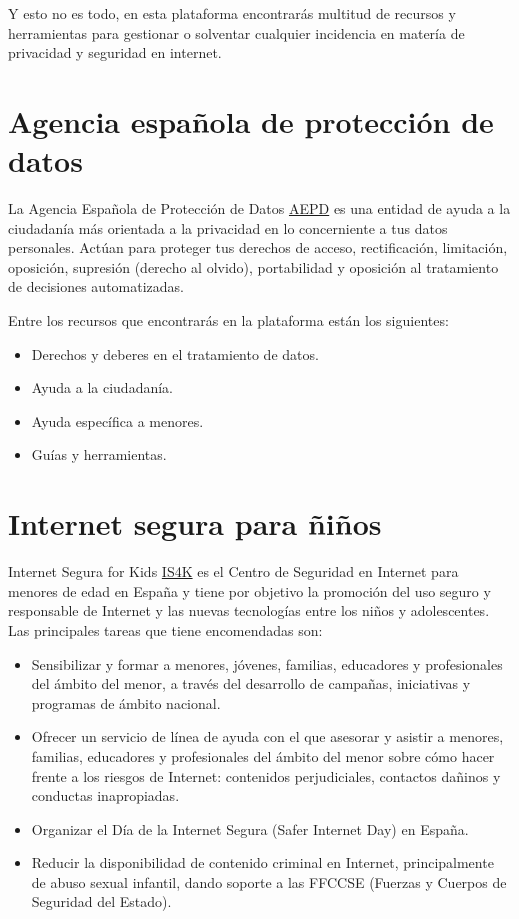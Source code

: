 \documentclass[
  spanish,
  a4paper,
  openany]{book}
\begin{document}
Y esto no es todo, en esta plataforma encontrarás multitud de recursos y herramientas para gestionar o solventar cualquier incidencia en matería de privacidad y seguridad en internet.

\hypertarget{agencia-espauxf1ola-de-protecciuxf3n-de-datos}{%
\section{Agencia española de protección de datos}\label{agencia-espauxf1ola-de-protecciuxf3n-de-datos}}

La Agencia Española de Protección de Datos \href{https://www.aepd.es/es}{AEPD} es una entidad de ayuda a la ciudadanía más orientada a la privacidad en lo concerniente a tus datos personales. Actúan para proteger tus derechos de acceso, rectificación, limitación, oposición, supresión (derecho al olvido), portabilidad y oposición al tratamiento de decisiones automatizadas.

Entre los recursos que encontrarás en la plataforma están los siguientes:

\begin{itemize}
\item
  Derechos y deberes en el tratamiento de datos.
\item
  Ayuda a la ciudadanía.
\item
  Ayuda específica a menores.
\item
  Guías y herramientas.
\end{itemize}

\hypertarget{internet-segura-para-uxf1iuxf1os}{%
\section{Internet segura para ñiños}\label{internet-segura-para-uxf1iuxf1os}}

Internet Segura for Kids \href{https://www.is4k.es/}{IS4K} es el Centro de Seguridad en Internet para menores de edad en España y tiene por objetivo la promoción del uso seguro y responsable de Internet y las nuevas tecnologías entre los niños y adolescentes. Las principales tareas que tiene encomendadas son:

\begin{itemize}
\item
  Sensibilizar y formar a menores, jóvenes, familias, educadores y profesionales del ámbito del menor, a través del desarrollo de campañas, iniciativas y programas de ámbito nacional.
\item
  Ofrecer un servicio de línea de ayuda con el que asesorar y asistir a menores, familias, educadores y profesionales del ámbito del menor sobre cómo hacer frente a los riesgos de Internet: contenidos perjudiciales, contactos dañinos y conductas inapropiadas.
\item
  Organizar el Día de la Internet Segura (Safer Internet Day) en España.
\item
  Reducir la disponibilidad de contenido criminal en Internet, principalmente de abuso sexual infantil, dando soporte a las FFCCSE (Fuerzas y Cuerpos de Seguridad del Estado).
\end{itemize}
\end{document}
